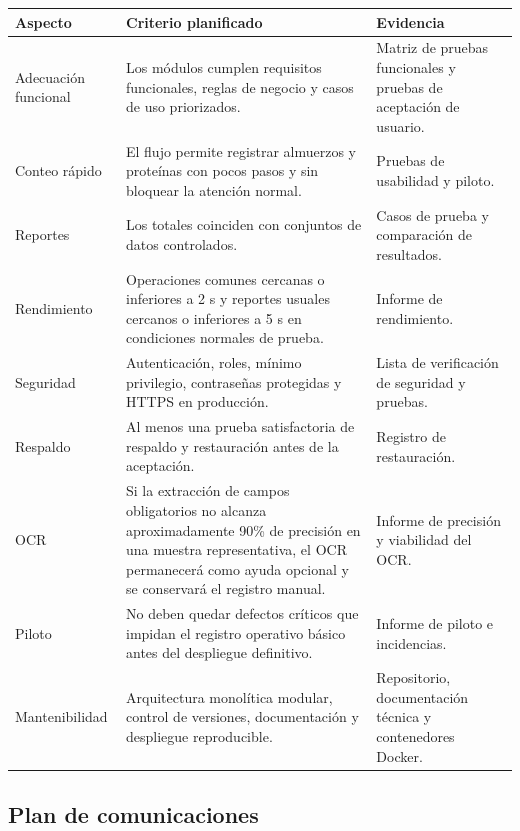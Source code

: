 \documentclass[12pt,a4paper]{article}
\begin{document}
\begin{longtable}{|p{4.2cm}|p{6.3cm}|p{5.0cm}|}
\hline
\rowcolor{tableheader}
\textbf{Aspecto} & \textbf{Criterio planificado} & \textbf{Evidencia} \\ \hline
Adecuación funcional & Los módulos cumplen requisitos funcionales, reglas de negocio y casos de uso priorizados. & Matriz de pruebas funcionales y pruebas de aceptación de usuario. \\ \hline
Conteo rápido & El flujo permite registrar almuerzos y proteínas con pocos pasos y sin bloquear la atención normal. & Pruebas de usabilidad y piloto. \\ \hline
Reportes & Los totales coinciden con conjuntos de datos controlados. & Casos de prueba y comparación de resultados. \\ \hline
Rendimiento & Operaciones comunes cercanas o inferiores a 2 s y reportes usuales cercanos o inferiores a 5 s en condiciones normales de prueba. & Informe de rendimiento. \\ \hline
Seguridad & Autenticación, roles, mínimo privilegio, contraseñas protegidas y HTTPS en producción. & Lista de verificación de seguridad y pruebas. \\ \hline
Respaldo & Al menos una prueba satisfactoria de respaldo y restauración antes de la aceptación. & Registro de restauración. \\ \hline
OCR & Si la extracción de campos obligatorios no alcanza aproximadamente 90\% de precisión en una muestra representativa, el OCR permanecerá como ayuda opcional y se conservará el registro manual. & Informe de precisión y viabilidad del OCR. \\ \hline
Piloto & No deben quedar defectos críticos que impidan el registro operativo básico antes del despliegue definitivo. & Informe de piloto e incidencias. \\ \hline
Mantenibilidad & Arquitectura monolítica modular, control de versiones, documentación y despliegue reproducible. & Repositorio, documentación técnica y contenedores Docker. \\ \hline
\end{longtable}

\subsection{Plan de comunicaciones}
\end{document}
